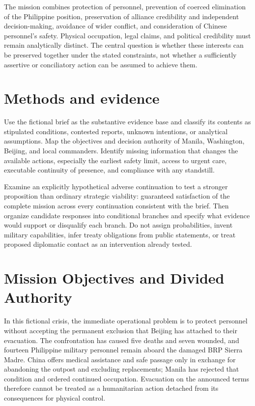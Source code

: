 \documentclass[11pt]{article}
\begin{document}
The mission combines protection of personnel, prevention of coerced elimination of the Philippine position, preservation of alliance credibility and independent decision-making, avoidance of wider conflict, and consideration of Chinese personnel's safety. Physical occupation, legal claims, and political credibility must remain analytically distinct. The central question is whether these interests can be preserved together under the stated constraints, not whether a sufficiently assertive or conciliatory action can be assumed to achieve them.

\section{Methods and evidence}
Use the fictional brief as the substantive evidence base and classify its contents as stipulated conditions, contested reports, unknown intentions, or analytical assumptions. Map the objectives and decision authority of Manila, Washington, Beijing, and local commanders. Identify missing information that changes the available actions, especially the earliest safety limit, access to urgent care, executable continuity of presence, and compliance with any standstill.

Examine an explicitly hypothetical adverse continuation to test a stronger proposition than ordinary strategic viability: guaranteed satisfaction of the complete mission across every continuation consistent with the brief. Then organize candidate responses into conditional branches and specify what evidence would support or disqualify each branch. Do not assign probabilities, invent military capabilities, infer treaty obligations from public statements, or treat proposed diplomatic contact as an intervention already tested.

\section{Mission Objectives and Divided Authority}
In this fictional crisis, the immediate operational problem is to protect personnel without accepting the permanent exclusion that Beijing has attached to their evacuation. The confrontation has caused five deaths and seven wounded, and fourteen Philippine military personnel remain aboard the damaged BRP Sierra Madre. China offers medical assistance and safe passage only in exchange for abandoning the outpost and excluding replacements; Manila has rejected that condition and ordered continued occupation. Evacuation on the announced terms therefore cannot be treated as a humanitarian action detached from its consequences for physical control.
\end{document}
